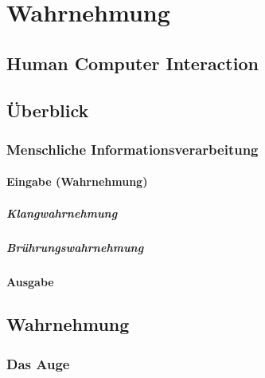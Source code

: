 \documentclass[a4paper, 11pt, accentcolor = tud3b]{tudreport}
\begin{document}
	\chapter{Wahrnehmung} %

		\section{Human Computer Interaction} %

		\section{Überblick} %

			\subsection{Menschliche Informationsverarbeitung} %

				\subsubsection{Eingabe (Wahrnehmung)} %

					\paragraph{Klangwahrnehmung} %

					\paragraph{Brührungswahrnehmung} %

				\subsubsection{Ausgabe} %

		\section{Wahrnehmung} %

			\subsection{Das Auge} %
\end{document}
